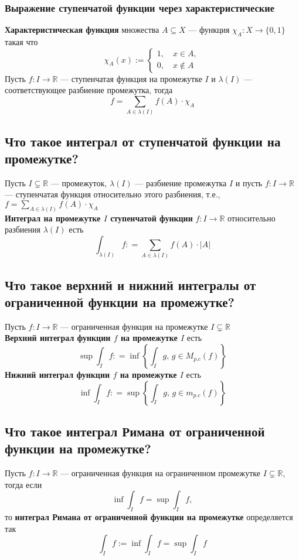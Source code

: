 \documentclass[a4paper]{article}
\begin{document}
\subsubsection*{Выражение ступенчатой функции через характеристические}
\textbf{Характеристическая функция} множества $A\subseteq X$ — функция $\chi_A:X\rightarrow\{0,1\}$ такая что
\begin{equation*}
    \chi_A(x):=\begin{cases}
        1,\quad x\in A,\\
        0,\quad x\notin A
    \end{cases}
\end{equation*}
\indent Пусть $f:I\rightarrow\mathbb{R}$ — ступенчатая функция на промежутке $I$ и $\lambda(I)$ — соответствующее разбиение промежутка, тогда
$$\boxed{f=\sum_{A\in\lambda(I)}f(A)\cdot\chi_A}$$

\subsection{Что такое интеграл от ступенчатой функции на промежутке?}
Пусть $I \subsetneq \mathbb{R}$ — промежуток, $\lambda(I)$ — разбиение промежутка $I$ и пусть $f:I \to \mathbb{R}$ — ступенчатая функция относительно этого разбиения, т.е., $f = \displaystyle\sum_{A \in \lambda(I)}f(A) \cdot \chi_A$\\[2mm]
\indent \textbf{Интеграл на промежутке $I$ ступенчатой функции} $f:I \to \mathbb{R}$ относительно разбиения $\lambda(I)$ есть
$$
\boxed{\int_{\lambda(I)}f: =  \sum_{A \in \lambda(I)} f(A)\cdot |A|}
$$

\subsection{Что такое верхний и нижний интегралы от ограниченной функции на промежутке?}
Пусть $f: I \to \mathbb{R}$ — ограниченная функция на промежутке $I \subsetneq \mathbb{R}$\\[2mm]
\indent \textbf{Верхний интеграл функции $f$ на промежутке $I$} есть
$$
\sup \int_I f  : = \inf  \left\{ \int_I g  , \, g \in M_{p.c}(f)\right\}
$$
\indent \textbf{Нижний интеграл функции $f$ на промежутке $I$} есть
$$
\inf \int_I f  : = \sup  \left\{ \int_I g  , \, g \in m_{p.c}(f)\right\}
$$

\subsection{Что такое интеграл Римана от ограниченной функции на промежутке?}
\label{1.15}
Пусть $f: I \to \mathbb{R}$ — ограниченная функция на ограниченном промежутке $I \subsetneq \mathbb{R}$, тогда если 
$$\inf\int_If=\sup\int_If,$$
то \textbf{интеграл Римана от ограниченной функции на промежутке} определяется так
$$\boxed{\int_If:=\inf\int_If=\sup\int_If}$$
\end{document}
